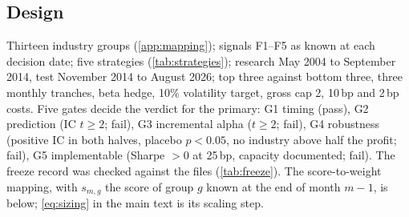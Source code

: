 \documentclass[11pt,letterpaper]{article}
\newcommand{\fit}[1]{\resizebox{\ifdim\width>\linewidth\linewidth\else\width\fi}{!}{#1}}
\newcommand{\tagc}{{\footnotesize\itshape confirmatory}}
\newcommand{\tagp}{{\footnotesize\itshape post hoc}}
\begin{document}
\subsection*{Design}
Thirteen industry groups (\cref{app:mapping}); signals F1--F5 as known at each
decision date; five strategies (\cref{tab:strategies}); research May 2004 to
September 2014, test November 2014 to August 2026; top three against bottom
three, three monthly tranches, beta hedge, 10\% volatility target, gross cap 2,
10\,bp and 2\,bp costs. Five gates decide the verdict for the primary: G1 timing
(pass), G2 prediction (IC $t\ge2$; fail), G3 incremental alpha ($t\ge2$; fail),
G4 robustness (positive IC in both halves, placebo $p<0.05$, no industry above
half the profit; fail), G5 implementable (Sharpe $>0$ at 25\,bp, capacity
documented; fail). %
The freeze record was checked against the files (\cref{tab:freeze}). %
The score-to-weight mapping, with $s_{m,g}$ the score of group $g$ known at the
end of month $m-1$, is below; \cref{eq:sizing} in the main text is its scaling
step.


\begin{table}[H]\centering\footnotesize\caption{Study 1: all five strategies in the test window. \hfill\tagc}\setlength{\tabcolsep}{4pt}\fit{}\end{table}
\begin{table}[H]\centering\scriptsize\caption{Study 1 robustness, full table: the four data versions, costs, sub-periods, drop-one-group, gates, and the diagnostics added in Study 2.3. \hfill\tagc\ / \tagp\ (last four rows)}\setlength{\tabcolsep}{4pt}\fit{}\end{table}
\begin{table}[H]\centering\scriptsize\caption{Risk overlay of every Study 1 and Study 1b strategy: how often the cap bound, ex-ante and realised volatility. \hfill\tagc}\setlength{\tabcolsep}{4pt}\fit{}\end{table}
\begin{table}[H]\centering\scriptsize\caption{Factor loadings of the Study 1 books (FF5, momentum, industry momentum). \hfill\tagc}\setlength{\tabcolsep}{4pt}\fit{}\end{table}
\begin{table}[H]\centering\scriptsize\caption{Freeze record, checked against the files in the repository. \hfill\tagc}\label{tab:freeze}\setlength{\tabcolsep}{4pt}\fit{}\end{table}
\end{document}
